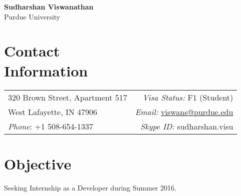 \documentclass[margin,line]{resume}
\begin{document}
    \begin{center}
    \hspace{-80pt}
    \Large \textbf{Sudharshan Viswanathan}\\
    \hspace{-80pt}
    \large Purdue University
    \end{center}

\begin{resume}
\vspace{-1mm}
    \section{\mysidestyle Contact \\Information}
   \begin{tabular}{l r}
       \hspace{-10pt} 320 Brown Street, Apartment 517 &\hspace{150pt} \emph{Visa Status:} \hspace{-0.2em} F1 (Student) \\
       \hspace{-10pt} West Lafayette, IN 47906        &\hspace{150pt} \emph{Email:} \href{mailto:viswans@purdue.edu}{viswans@purdue.edu}\\
       \hspace{-10pt} \emph{Phone}: +1 508-654-1337   &\hspace{150pt} \emph{Skype ID:} \hspace{-0.2em} sudharshan.visu \\

    \end{tabular}

\section{\mysidestyle Objective}
Seeking Internship as a Developer during Summer 2016.


\end{resume}
\end{document}
